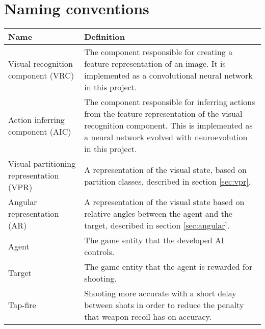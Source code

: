 
\section{Naming conventions}

\begin{table}[H]
\begin{center}

\begin{tabularx}{\textwidth}{ | l | X |}
		\hline
	
		\textbf{Name} & \textbf{Definition} \\ \hline
		Visual recognition component (VRC) & The component responsible for creating a feature representation of an image. It is implemented as a convolutional neural network in this project. \\ \hline
		Action inferring component (AIC) & The component responsible for inferring actions from the feature representation of the visual recognition component. This is implemented as a neural network evolved with neuroevolution in this project. \\ \hline
		Visual partitioning representation (VPR) & A representation of the visual state, based on partition classes, described in section \ref{sec:vpr}. \\ \hline
		
		Angular representation (AR) & A representation of the visual state based on relative angles between the agent and the target, described in section \ref{sec:angular}. \\ \hline
		Agent & The game entity that the developed AI controls. \\ \hline
		Target & The game entity that the agent is rewarded for shooting. \\ \hline
		
		Tap-fire & Shooting more accurate with a short delay between shots in order to reduce the penalty that weapon recoil has on accuracy. \\ \hline
		
\end{tabularx}
\end{center}
\label{tab:naming-conventions} 
\end{table}

\newpage